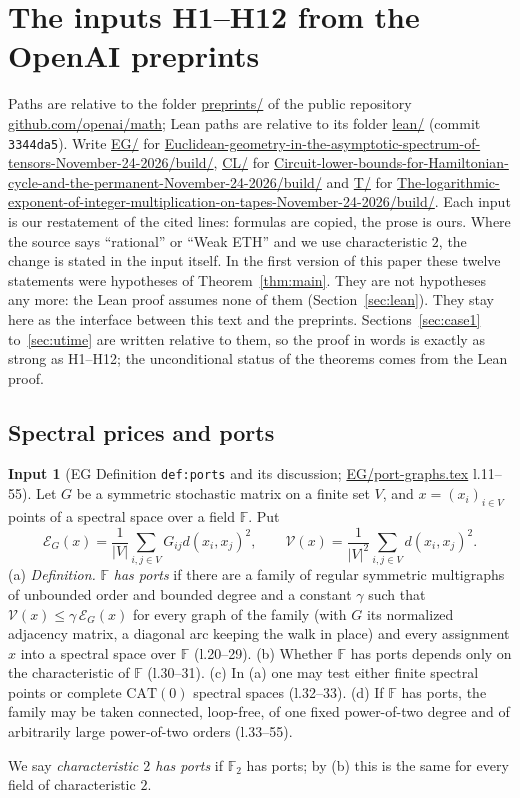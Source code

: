 \documentclass[11pt]{article}
\theoremstyle{definition}
\newtheorem{hyp}{Input}
\theoremstyle{remark}
\newcommand{\F}{\mathbb F}
\newcommand{\src}[1]{\url{#1}}
\begin{document}
\section{The inputs H1--H12 from the OpenAI preprints}\label{sec:hyp}

Paths are relative to the folder \src{preprints/} of the public repository \src{github.com/openai/math}; Lean paths are relative to its
folder \src{lean/} (commit \texttt{3344da5}). Write
\src{EG/} for \src{Euclidean-geometry-in-the-asymptotic-spectrum-of-tensors-November-24-2026/build/},
\src{CL/} for \src{Circuit-lower-bounds-for-Hamiltonian-cycle-and-the-permanent-November-24-2026/build/} and
\src{T/} for \src{The-logarithmic-exponent-of-integer-multiplication-on-tapes-November-24-2026/build/}.
Each input is our restatement of the cited lines: formulas are copied, the prose is ours. Where the source says
``rational'' or ``Weak ETH'' and we use characteristic $2$, the change is stated in the input itself.
In the first version of this paper these twelve statements were hypotheses of Theorem~\ref{thm:main}. They are not hypotheses
any more: the Lean proof assumes none of them (Section~\ref{sec:lean}). They stay here as the interface between this text and
the preprints. Sections~\ref{sec:case1} to~\ref{sec:utime} are written relative to them, so the proof in words is exactly as
strong as H1--H12; the unconditional status of the theorems comes from the Lean proof.

\subsection{Spectral prices and ports}

\begin{hyp}[EG Definition \texttt{def:ports} and its discussion; \src{EG/port-graphs.tex} l.11--55]\label{H1}
Let $G$ be a symmetric stochastic matrix on a finite set $V$, and $x=(x_i)_{i\in V}$ points of a spectral space over a field
$\F$. Put
\[
 \mathcal E_G(x)=\frac1{|V|}\sum_{i,j\in V}G_{ij}d(x_i,x_j)^2,\qquad
 \mathcal V(x)=\frac1{|V|^2}\sum_{i,j\in V}d(x_i,x_j)^2 .
\]
(a) \emph{Definition.} $\F$ \emph{has ports} if there are a family of regular symmetric multigraphs of unbounded order and
bounded degree and a constant $\gamma$ such that $\mathcal V(x)\le\gamma\,\mathcal E_G(x)$ for every graph of the family (with
$G$ its normalized adjacency matrix, a diagonal arc keeping the walk in place) and every assignment $x$ into a spectral space
over $\F$ (l.20--29).
(b) Whether $\F$ has ports depends only on the characteristic of $\F$ (l.30--31).
(c) In (a) one may test either finite spectral points or complete $\mathrm{CAT}(0)$ spectral spaces (l.32--33).
(d) If $\F$ has ports, the family may be taken connected, loop-free, of one fixed power-of-two degree and of arbitrarily large
power-of-two orders (l.33--55).
\end{hyp}
We say \emph{characteristic $2$ has ports} if $\F_2$ has ports; by (b) this is the same for every field of characteristic $2$.
\end{document}
